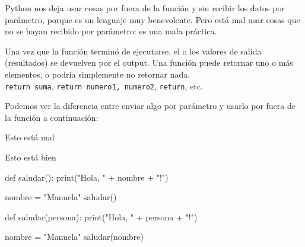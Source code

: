 \documentclass[
  letterpaper,
  DIV=11,
  numbers=noendperiod]{scrreprt}
\newenvironment{Shaded}{\begin{snugshade}}{\end{snugshade}}
\newcommand{\BuiltInTok}[1]{\textcolor[rgb]{0.00,0.23,0.31}{#1}}
\newcommand{\KeywordTok}[1]{\textcolor[rgb]{0.00,0.23,0.31}{#1}}
\newcommand{\NormalTok}[1]{\textcolor[rgb]{0.00,0.23,0.31}{#1}}
\newcommand{\OperatorTok}[1]{\textcolor[rgb]{0.37,0.37,0.37}{#1}}
\newcommand{\StringTok}[1]{\textcolor[rgb]{0.13,0.47,0.30}{#1}}
\begin{document}
\begin{tcolorbox}[enhanced jigsaw, colframe=quarto-callout-warning-color-frame, opacityback=0, opacitybacktitle=0.6, bottomrule=.15mm, toprule=.15mm, coltitle=black, breakable, colback=white, leftrule=.75mm, titlerule=0mm, bottomtitle=1mm, toptitle=1mm, rightrule=.15mm, title=\textcolor{quarto-callout-warning-color}{\faExclamationTriangle}\hspace{0.5em}{¡Cuidado!}, arc=.35mm, left=2mm, colbacktitle=quarto-callout-warning-color!10!white]

Python nos deja usar cosas por fuera de la función y sin recibir los
datos por parámetro, porque es un lenguaje muy benevolente. Pero está
mal usar cosas que no se hayan recibido por parámetro: es una mala
práctica.

\end{tcolorbox}

Una vez que la función terminó de ejecutarse, el o los valores de salida
(resultados) se devuelven por el output. Una función puede retornar uno
o más elementos, o podría simplemente no retornar nada.\\
\texttt{return\ suma}, \texttt{return\ numero1,\ numero2},
\texttt{return}, etc.

Podemos ver la diferencia entre enviar algo por parámetro y usarlo por
fuera de la función a continuación:

Esto está mal

Esto está bien

\begin{Shaded}
\begin{Highlighting}[]
\KeywordTok{def}\NormalTok{ saludar():}
  \BuiltInTok{print}\NormalTok{(}\StringTok{"Hola, "} \OperatorTok{+}\NormalTok{ nombre }\OperatorTok{+} \StringTok{"!"}\NormalTok{)}

\NormalTok{nombre }\OperatorTok{=} \StringTok{"Manuela"}
\NormalTok{saludar()}
\end{Highlighting}
\end{Shaded}

\begin{Shaded}
\begin{Highlighting}[]
\KeywordTok{def}\NormalTok{ saludar(persona):}
  \BuiltInTok{print}\NormalTok{(}\StringTok{"Hola, "} \OperatorTok{+}\NormalTok{ persona }\OperatorTok{+} \StringTok{"!"}\NormalTok{)}

\NormalTok{nombre }\OperatorTok{=} \StringTok{"Manuela"}
\NormalTok{saludar(nombre)}
\end{Highlighting}
\end{Shaded}
\end{document}
